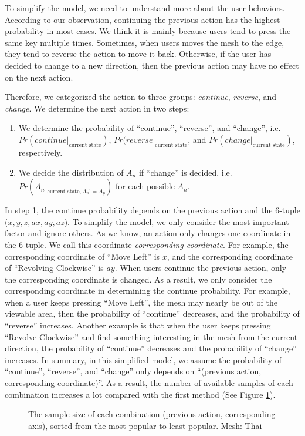 To simplify the model, we need to understand more about the user behaviors.
According to our observation, continuing the previous action has the highest probability in most cases. 
We think it is mainly because users tend to press the same key multiple times. 
Sometimes, when users moves the mesh to the edge, they tend to reverse the action to move it back. 
Otherwise, if the user has decided to change to a new direction, 
then the previous action may have no effect on the next action.

Therefore, we categorized the action to three groups: \textit{continue}, \textit{reverse}, and \textit{change}. 
We determine the next action in two steps:
\begin{enumerate}
    \item We determine the probability of ``continue'', ``reverse'', and ``change'',
        i.e. $Pr(continue|_{\textrm{current state}})$, 
        $Pr(reverse|_{\textrm{current state}}$, 
        and $Pr(change|_{\textrm{current state}})$,
        respectively. 
    \item We decide the distribution of $A_n$ if ``change'' is decided, 
        i.e. $Pr(A_n |_{\textrm{current state}, A_n != A_p})$ 
        for each possible $A_n$. 
\end{enumerate}

In step 1, the continue probability depends on the previous action and the 6-tuple ($x, y, z, ax, ay, az$).
To simplify the model, we only consider the most important factor and ignore others. 
As we know, an action only changes one coordinate in the 6-tuple. We call this coordinate \textit{corresponding coordinate}.
For example, the corresponding coordinate of ``Move Left'' is $x$, and the corresponding coordinate of 
``Revolving Clockwise'' is $ay$. 
When users continue the previous action, only the corresponding coordinate is changed. As a result, we 
only consider the corresponding coordinate in determining the continue probability. 
For example, when a user keeps pressing ``Move Left'', the mesh may nearly be out of the viewable area, 
then the probability of ``continue'' decreases, and the probability of ``reverse'' increases. 
Another example is that when the user keeps pressing ``Revolve Clockwise'' and find something interesting
in the mesh from the current direction,
the probability of ``continue'' decreases and the probability of ``change'' increases.
In summary, in this simplified model, we assume the probability of ``continue'', ``reverse'', and ``change''
only depends on ``(previous action, corresponding coordinate)''.
As a result, the number of available samples of each combination increases a lot compared with the first method
(See Figure \ref{f:user:newsample}). 
\begin{figure}
    \centering
    \caption{The sample size of each combination (previous action, corresponding axis), 
    sorted from the most popular to least popular.  Mesh: Thai}
    \label{f:user:newsample}
\end{figure}

